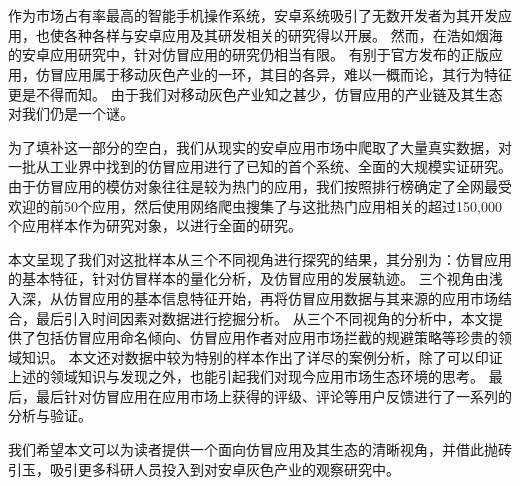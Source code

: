 
\chapter*{}


\setlength{\baselineskip}{25pt}	



作为市场占有率最高的智能手机操作系统，安卓系统吸引了无数开发者为其开发应用，也使各种各样与安卓应用及其研发相关的研究得以开展。
然而，在浩如烟海的安卓应用研究中，针对仿冒应用的研究仍相当有限。
有别于官方发布的正版应用，仿冒应用属于移动灰色产业的一环，其目的各异，难以一概而论，其行为特征更是不得而知。
由于我们对移动灰色产业知之甚少，仿冒应用的产业链及其生态对我们仍是一个谜。


为了填补这一部分的空白，我们从现实的安卓应用市场中爬取了大量真实数据，对一批从工业界中找到的仿冒应用进行了已知的首个系统、全面的大规模实证研究。
由于仿冒应用的模仿对象往往是较为热门的应用，我们按照排行榜确定了全网最受欢迎的前50个应用，然后使用网络爬虫搜集了与这批热门应用相关的超过150,000个应用样本作为研究对象，以进行全面的研究。


本文呈现了我们对这批样本从三个不同视角进行探究的结果，其分别为：仿冒应用的基本特征，针对仿冒样本的量化分析，及仿冒应用的发展轨迹。
三个视角由浅入深，从仿冒应用的基本信息特征开始，再将仿冒应用数据与其来源的应用市场结合，最后引入时间因素对数据进行挖掘分析。
从三个不同视角的分析中，本文提供了包括仿冒应用命名倾向、仿冒应用作者对应用市场拦截的规避策略等珍贵的领域知识。
本文还对数据中较为特别的样本作出了详尽的案例分析，除了可以印证上述的领域知识与发现之外，也能引起我们对现今应用市场生态环境的思考。
最后，最后针对仿冒应用在应用市场上获得的评级、评论等用户反馈进行了一系列的分析与验证。


我们希望本文可以为读者提供一个面向仿冒应用及其生态的清晰视角，并借此抛砖引玉，吸引更多科研人员投入到对安卓灰色产业的观察研究中。


 
